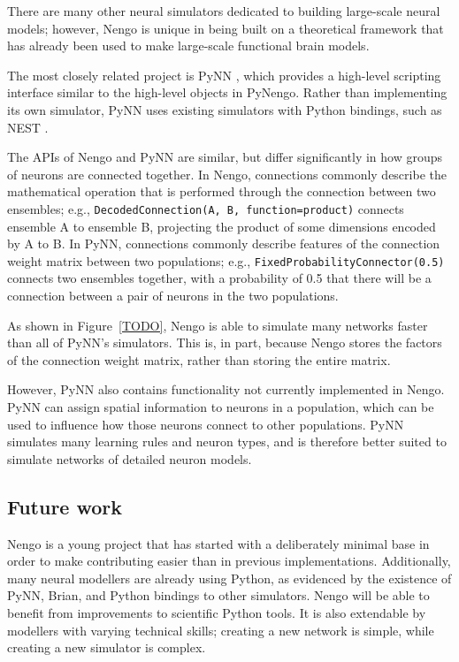 \documentclass{frontiersSCNS}
\begin{document}
There are many other neural simulators
dedicated to building large-scale neural models;
however, Nengo is unique in being built
on a theoretical framework
that has already been used to make
large-scale functional brain models.

The most closely related project is PyNN
\cite{TODO},
which provides a high-level scripting
interface similar to the
high-level objects in PyNengo.
Rather than implementing its
own simulator, PyNN uses existing
simulators with Python bindings,
such as NEST \cite{TODO}.

The APIs of Nengo and PyNN are similar,
but differ significantly
in how groups of neurons are connected together.
In Nengo, connections commonly describe
the mathematical operation that is performed
through the connection between
two ensembles;
e.g., \texttt{DecodedConnection(A, B,
function=product)} connects ensemble A
to ensemble B, projecting the product of
some dimensions encoded by A to B.
In PyNN, connections commonly describe
features of the connection weight matrix
between two populations;
e.g., \texttt{FixedProbabilityConnector(0.5)}
connects two ensembles together,
with a probability of 0.5
that there will be a connection
between a pair of neurons in the two populations.

As shown in Figure~\ref{TODO},
Nengo is able to simulate many networks
faster than all of PyNN's simulators.
This is, in part,
because Nengo stores the factors
of the connection weight matrix,
rather than storing the entire matrix.

However, PyNN also contains functionality
not currently implemented in Nengo.
PyNN can assign spatial information
to neurons in a population,
which can be used to influence
how those neurons connect to other populations.
PyNN simulates many learning rules
and neuron types,
and is therefore better suited to
simulate networks of detailed neuron models.

\subsection{Future work}

Nengo is a young project that
has started with a deliberately minimal base
in order to make contributing easier than in
previous implementations.
Additionally, many neural modellers
are already using Python,
as evidenced by the existence of
PyNN, Brian, and Python bindings to other simulators.
Nengo will be able to benefit
from improvements to scientific Python tools.
It is also extendable by modellers with
varying technical skills;
creating a new network is simple,
while creating a new simulator is complex.
\end{document}
